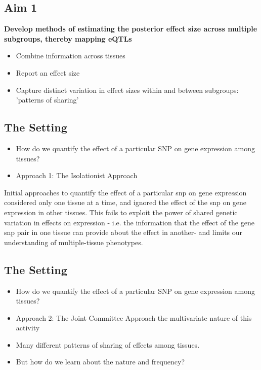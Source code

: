 \documentclass[10pt,letterpaper]{article}
\begin{document}
 

\subsection{Aim 1}
{\textbf {Develop methods of estimating the posterior effect size across multiple subgroups, thereby mapping eQTLs }}
\begin{itemize}
\item Combine information across tissues%
\item Report an effect size %
\item Capture distinct variation in effect sizes within and between subgroups: 'patterns of sharing' %
%
\end{itemize}

\subsection{The Setting}
\begin{itemize}
\item{How do we quantify the effect of a particular SNP on gene expression among tissues?}
\item{Approach 1: The Isolationist Approach}
\end{itemize}
%
Initial approaches to quantify the effect of a particular snp on gene expression considered only one tissue at a time, and ignored the effect of the snp on gene expression in other tissues. This fails to  exploit the power of  shared genetic variation in effects on expression - i.e. the information that the effect of the gene snp pair in one tissue can provide about the effect in another- and limits our understanding of multiple-tissue phenotypes. 



\subsection{The Setting}
\begin{itemize}
\item{How do we quantify the effect of a particular SNP on gene expression among tissues?}
\item{Approach 2: The Joint Committee Approach}
\itemRecognize the multivariate nature of this activity
\item Many different patterns of sharing of effects among tissues.
\item But how do we learn about the nature and frequency?
\end{itemize}
\end{document}
